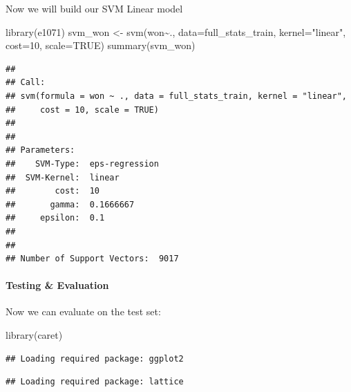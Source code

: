 \documentclass[
]{article}
\newenvironment{Shaded}{\begin{snugshade}}{\end{snugshade}}
\newcommand{\AttributeTok}[1]{\textcolor[rgb]{0.77,0.63,0.00}{#1}}
\newcommand{\ConstantTok}[1]{\textcolor[rgb]{0.00,0.00,0.00}{#1}}
\newcommand{\DecValTok}[1]{\textcolor[rgb]{0.00,0.00,0.81}{#1}}
\newcommand{\FloatTok}[1]{\textcolor[rgb]{0.00,0.00,0.81}{#1}}
\newcommand{\FunctionTok}[1]{\textcolor[rgb]{0.00,0.00,0.00}{#1}}
\newcommand{\NormalTok}[1]{#1}
\newcommand{\OtherTok}[1]{\textcolor[rgb]{0.56,0.35,0.01}{#1}}
\newcommand{\SpecialCharTok}[1]{\textcolor[rgb]{0.00,0.00,0.00}{#1}}
\newcommand{\StringTok}[1]{\textcolor[rgb]{0.31,0.60,0.02}{#1}}
\begin{document}
Now we will build our SVM Linear model

\begin{Shaded}
\begin{Highlighting}[]
\FunctionTok{library}\NormalTok{(e1071)}
\NormalTok{svm\_won }\OtherTok{\textless{}{-}} \FunctionTok{svm}\NormalTok{(won}\SpecialCharTok{\textasciitilde{}}\NormalTok{., }\AttributeTok{data=}\NormalTok{full\_stats\_train, }\AttributeTok{kernel=}\StringTok{"linear"}\NormalTok{, }\AttributeTok{cost=}\DecValTok{10}\NormalTok{, }\AttributeTok{scale=}\ConstantTok{TRUE}\NormalTok{)}
\FunctionTok{summary}\NormalTok{(svm\_won)}
\end{Highlighting}
\end{Shaded}

\begin{verbatim}
## 
## Call:
## svm(formula = won ~ ., data = full_stats_train, kernel = "linear", 
##     cost = 10, scale = TRUE)
## 
## 
## Parameters:
##    SVM-Type:  eps-regression 
##  SVM-Kernel:  linear 
##        cost:  10 
##       gamma:  0.1666667 
##     epsilon:  0.1 
## 
## 
## Number of Support Vectors:  9017
\end{verbatim}

\hypertarget{testing-evaluation}{%
\paragraph{Testing \& Evaluation}\label{testing-evaluation}}

Now we can evaluate on the test set:

\begin{Shaded}
\begin{Highlighting}[]
\FunctionTok{library}\NormalTok{(caret)}
\end{Highlighting}
\end{Shaded}

\begin{verbatim}
## Loading required package: ggplot2
\end{verbatim}

\begin{verbatim}
## Loading required package: lattice
\end{verbatim}

\begin{Shaded}
\end{Shaded}
\end{document}
